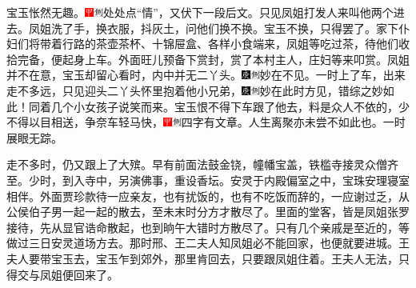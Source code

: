 宝玉怅然无趣。{\includegraphics[width=3mm]{../Images/00002}\includegraphics[width=3mm]{../Images/00011}\footnotesize \kaishu 处处点“情”，又伏下一段后文。}只见凤姐打发人来叫他两个进去。凤姐洗了手，换衣服，抖灰土，问他们换不换。宝玉不换，只得罢了。家下仆妇们将带着行路的茶壶茶杯、十锦屉盒、各样小食端来，凤姐等吃过茶，待他们收拾完备，便起身上车。外面旺儿预备下赏封，赏了本村主人，庄妇等来叩赏。凤姐并不在意，宝玉却留心看时，内中并无二丫头。{\includegraphics[width=3mm]{../Images/00004}\includegraphics[width=3mm]{../Images/00011}\footnotesize \kaishu 妙在不见。}一时上了车，出来走不多远，只见迎头二丫头怀里抱着他小兄弟，{\includegraphics[width=3mm]{../Images/00004}\includegraphics[width=3mm]{../Images/00011}\footnotesize \kaishu 妙在此时方见，错综之妙如此！}同着几个小女孩子说笑而来。宝玉恨不得下车跟了他去，料是众人不依的，少不得以目相送，争奈车轻马快，{\includegraphics[width=3mm]{../Images/00002}\includegraphics[width=3mm]{../Images/00011}\footnotesize \kaishu 四字有文章。人生离聚亦未尝不如此也。}一时展眼无踪。

走不多时，仍又跟上了大殡。早有前面法鼓金铙，幢幡宝盖，铁槛寺接灵众僧齐至。少时，到入寺中，另演佛事，重设香坛。安灵于内殿偏室之中，宝珠安理寝室相伴。外面贾珍款待一应亲友，也有扰饭的，也有不吃饭而辞的，一应谢过乏，从公侯伯子男一起一起的散去，至未末时分方才散尽了。里面的堂客，皆是凤姐张罗接待，先从显官诰命散起，也到晌午大错时方散尽了。只有几个亲戚是至近的，等做过三日安灵道场方去。那时邢、王二夫人知凤姐必不能回家，也便就要进城。王夫人要带宝玉去，宝玉乍到郊外，那里肯回去，只要跟凤姐住着。王夫人无法，只得交与凤姐便回来了。

